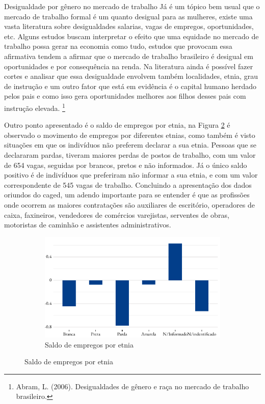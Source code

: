 \begin{smbox}[label={labelbox},nameref={Desigualdade por gênero}]{Desigualdade por gênero no mercado de trabalho}
	Já é um tópico bem usual que o mercado de trabalho formal é um quanto desigual para as mulheres, existe uma vasta literatura sobre desigualdades salarias, vagas de empregos, oportunidades, etc. Alguns estudos buscam interpretar o efeito que uma equidade no mercado de trabalho possa gerar na economia como tudo, estudos que provocam essa afirmativa tendem a afirmar que o mercado de trabalho brasileiro é desigual em oportunidades e por consequência na renda. Na literatura ainda é possível fazer cortes e analisar que essa desigualdade envolvem também localidades, etnia, grau de instrução e um outro fator que está em evidência é o capital humano herdado pelos pais e como isso gera oportunidades melhores aos filhos desses pais com instrução elevada.
	\footnote{Abram, L. (2006). Desigualdades de gênero e raça no mercado de trabalho brasileiro.}

\end{smbox}



\par Outro ponto apresentado é o saldo de empregos por etnia, na Figura \ref{fig:sel2020} é observado o movimento de empregos por diferentes etnias, como também é visto situações em que os indivíduos não preferem declarar a sua etnia. Pessoas que se declararam pardas, tiveram maiores perdas de postos de trabalho, com um valor de 654 vagas, seguidas por brancos, pretos e não informados. Já o único saldo positivo é de indivíduos que preferiram não informar a sua etnia, e com um valor correspondente de 545 vagas de trabalho. Concluindo a apresentação dos dados oriundos do \acrshort{caged}, um adendo importante para se entender é que as profissões onde ocorrem as maiores contratações são auxiliares de escritório, operadores de caixa, faxineiros, vendedores de comércios varejistas, serventes de obras, motoristas de caminhão e assistentes administrativos.


\begin{figure}[!h]
\begin{subfigure}{\linewidth}
	\caption{Saldo de empregos por etnia}
	\label{fig:sel2020}
	\includegraphics{fig/Saldo por etnia.pdf}
\end{subfigure}
\end{figure}




